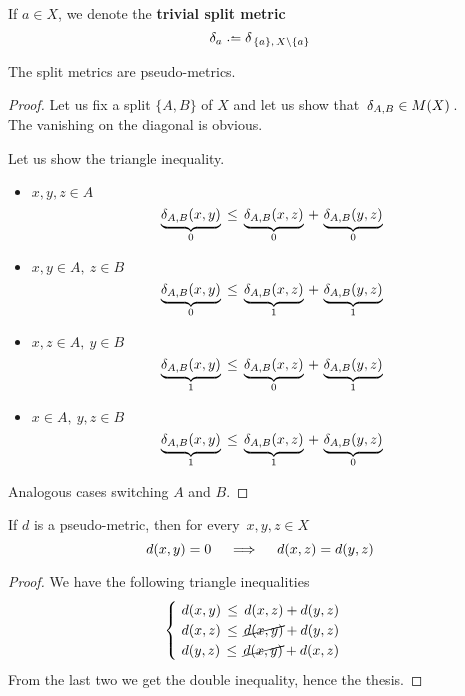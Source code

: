 \documentclass[./main.tex]{subfiles}
\begin{document}
\begin{notation}
    If $a \in X$, we denote the \textbf{trivial split metric}
    \[ \delta_a \defeq \delta_{\,\{a\},\, X \setminus \{a\}} \nospblw \]
\end{notation}\vspace{-\baselineskip}

\begin{proposition}
    The split metrics are pseudo-metrics.
\end{proposition}
\begin{proof}
    Let us fix a split $\{A,B\}$ of $X$ and let us show that $\, \delta_{A,B} \in M(X) \,$. \\
    The vanishing on the diagonal is obvious.

    Let us show the triangle inequality.
    \begin{itemize}[noitemsep]
        \item $x,y,z \in A$
        \[ \underbrace{\dAB(x,y)}_{0} \,\leq\, \underbrace{\dAB(x,z)}_{0} \,+\, \underbrace{\dAB(y,z)}_{0} \nospblw \nospabv \]
        \item $x,y \in A,\ z \in B$
        \[ \underbrace{\dAB(x,y)}_{0} \,\leq\, \underbrace{\dAB(x,z)}_{1} \,+\, \underbrace{\dAB(y,z)}_{1} \nospblw \]
        \item $x,z \in A,\ y \in B$
        \[ \underbrace{\dAB(x,y)}_{1} \,\leq\, \underbrace{\dAB(x,z)}_{0} \,+\, \underbrace{\dAB(y,z)}_{1} \nospblw \]
        \item $x \in A,\ y,z \in B$
        \[ \underbrace{\dAB(x,y)}_{1} \,\leq\, \underbrace{\dAB(x,z)}_{1} \,+\, \underbrace{\dAB(y,z)}_{0} \nospblw \]
    \end{itemize}
    Analogous cases switching $A$ and $B$. \qedhere
\end{proof}

\begin{lemma} \label{lemma:dzdeq}
    If $d$ is a pseudo-metric, then for every $\, x,y,z \in X \,$
    \[ d(x,y) = 0 \quad \implies \quad d(x,z) = d(y,z) \nospblw \]
\end{lemma}\vspace{-\baselineskip}
\begin{proof}
    We have the following triangle inequalities
    \[ \begin{cases}
        \ d(x,y) \,\leq\, d(x,z) + d(y,z) \\
        \ d(x,z) \,\leq\, \cancel{d(x,y)} + d(y,z) \\
        \ d(y,z) \,\leq\, \cancel{d(x,y)} + d(x,z)
        \end{cases} \]
    From the last two we get the double inequality, hence the thesis.
\end{proof}\vspace{-\baselineskip}
\end{document}
